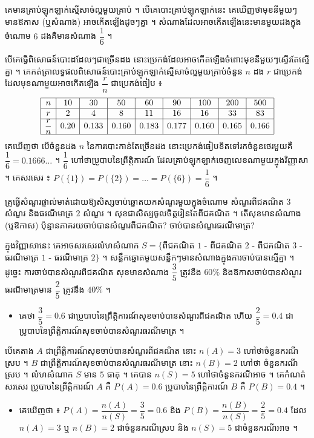 \begin{example}[ឧទាហរណ៍ ១]
គេមានគ្រាប់ឡុកឡាក់ស្មើសាច់ល្អមួយគ្រាប់ ។ បើគេបោះគ្រាប់ឡុកឡាក់នេះ គេឃើញថាមុខនីមួយៗមានឱកាស (ឬសំណាង) អាចកើតឡើងដូចៗគ្នា ។ សំណាងដែលអាចកើតឡើងនេះមានមួយដងក្នុងចំណោម $6$ ដងគឺមានសំណាង $\dfrac{1}{6}$ ។
\end{example}
បើគេធ្វើពិសោធន៍បោះដដែលៗជាច្រើនដង នោះប្រេកង់ដែលអាចកើតឡើងចំពោះមុខនីមួយៗស្ទើរតែស្មើគ្នា ។ គេកត់ត្រាលទ្ធផលពិសោធន៍បោះគ្រាប់ឡុកឡាក់ស្មើសាច់ល្អមួយគ្រាប់ចំនួន $n$ ដង $r$ ជាប្រេកង់ដែលមុខណាមួយអាចកើតឡើង $\dfrac{r}{n}$ ជាប្រេកង់ធៀប ៖
\[
\begin{array}{|c|c|c|c|c|c|c|c|c|}\hline
n & 10 & 30 & 50 & 60 & 90 & 100 & 200 & 500\\ \hline
r & 2 & 4 & 8 & 11 & 16 & 16 & 33 & 83\\ \hline
\dfrac{r}{n} & 0.20 & 0.133 & 0.160 & 0.183 & 0.177 & 0.160 & 0.165 & 0.166\\ \hline
\end{array}
\]
គេឃើញថា បើចំនួនដង $n$ នៃការបោះកាន់តែច្រើនដង នោះប្រេកង់ធៀបខិតទៅរកចំនួនថេរមួយគឺ $\dfrac{1}{6} = 0.1666\dots$ ។ $\dfrac{1}{6}$ ហៅថាប្រូបាបនៃព្រឹត្តិការណ៍ ដែលគ្រាប់ឡុកឡាក់ចេញលេខណាមួយក្នុងវិញ្ញាសា ។ គេសរសេរ ៖ $P(\{1\}) = P(\{2\}) = \dots = P(\{6\}) = \dfrac{1}{6}$ ។

\begin{example}[ឧទាហរណ៍ ២]
គ្រូធ្វើសំណួរផ្ទាល់មាត់ដោយឱ្យសិស្សចាប់ឆ្នោតយកសំណួរមួយក្នុងចំណោម សំណួរពីជគណិត $3$ សំណួរ និងធរណីមាត្រ $2$ សំណួរ ។ សុខជាសិស្សចូលចិត្តរៀនតែពីជគណិត ។ តើសុខមានសំណាង (ឬឱកាស) ប៉ុន្មានភាគរយចាប់បានសំណួរពីជគណិត? ចាប់បានសំណួរធរណីមាត្រ?
\end{example}
ក្នុងវិញ្ញាសានេះ គេអាចសរសេរលំហសំណាក $S = \{$ពីជគណិត $1$ - ពីជគណិត $2$ - ពីជគណិត $3$ - ធរណីមាត្រ $1$ - ធរណីមាត្រ $2\}$ ។ សន្លឹកឆ្នោតមួយសន្លឹកៗមានសំណាងក្នុងការចាប់បានស្មើគ្នា ។ ដូច្នេះ ការចាប់បានសំណួរពីជគណិត សុខមានសំណាង $\dfrac{3}{5}$ ត្រូវនឹង $60\%$ និងឱកាសចាប់បានសំណួរធរណីមាត្រមាន $\dfrac{2}{5}$ ត្រូវនឹង $40\%$ ។
\begin{itemize}
  \item គេថា $\dfrac{3}{5} = 0.6$ ជាប្រូបាបនៃព្រឹត្តិការណ៍សុខចាប់បានសំណួរពីជគណិត ហើយ $\dfrac{2}{5} = 0.4$ ជាប្រូបាបនៃព្រឹត្តិការណ៍សុខចាប់បានសំណួរធរណីមាត្រ ។
\end{itemize}
បើគេតាង $A$ ជាព្រឹត្តិការណ៍សុខចាប់បានសំណួរពីជគណិត នោះ $n(A) = 3$ ហៅថាចំនួនករណីស្រប ។ $B$ ជាព្រឹត្តិការណ៍សុខចាប់បានសំណួរធរណីមាត្រ នោះ $n(B) = 2$ ហៅថា ចំនួនករណីស្រប ។ លំហសំណាក $S$ មាន $5$ ធាតុ ។ គេបាន $n(S) = 5$ ហៅថាចំនួនករណីអាច ។ គេកំណត់សរសេរ ប្រូបាបនៃព្រឹត្តិការណ៍ $A$ គឺ $P(A) = 0.6$ ប្រូបាបនៃព្រឹត្តិការណ៍ $B$ គឺ $P(B) = 0.4$ ។
\begin{itemize}
  \item គេឃើញថា ៖ $P(A) = \dfrac{n(A)}{n(S)} = \dfrac{3}{5} = 0.6$ និង $P(B) = \dfrac{n(B)}{n(S)} = \dfrac{2}{5} = 0.4$ ដែល $n(A) = 3$ ឬ $n(B) = 2$ ជាចំនួនករណីស្រប និង $n(S) = 5$ ជាចំនួនករណីអាច ។
\end{itemize}

